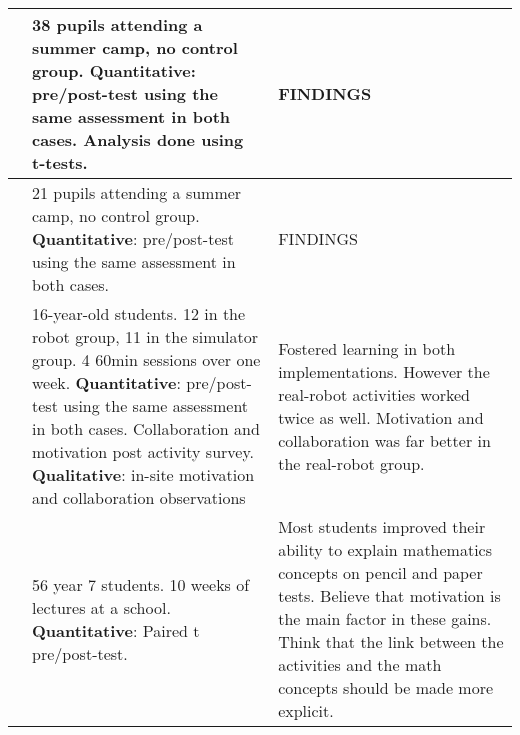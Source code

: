 \begin{longtable}{@{\extracolsep{\fill}}p{}p{}@{\hspace{20pt}}p{}}
	\tcite{nugent2008effect} & 38 pupils attending a summer camp, no control group. \textbf{Quantitative}: pre/post-test using the same assessment in both cases. Analysis done using t-tests. & FINDINGS \\\hline
	
	\tcite{williams2007acquisition} & 21 pupils attending a summer camp, no control group. \textbf{Quantitative}: pre/post-test using the same assessment in both cases.  & FINDINGS \\\hline
	\tcite{mitnik2009collaborative} & 16-year-old students. 12 in the robot group, 11 in the simulator group. 4 60min sessions over one week. \textbf{Quantitative}: pre/post-test using the same assessment in both cases. Collaboration and motivation post activity survey. \textbf{Qualitative}: in-site motivation and collaboration observations & Fostered learning in both implementations. However the real-robot activities worked twice as well. Motivation and collaboration was far better in the real-robot group. \\\hline
	\tcite{norton2004using} & 56 year 7 students. 10 weeks of lectures at a school. \textbf{Quantitative}: Paired t pre/post-test.  & Most students improved their ability to explain mathematics concepts on pencil and paper tests. Believe that motivation is the main factor in these gains. Think that the link between the activities and the math concepts should be made more explicit. \\\hline
\end{longtable}
